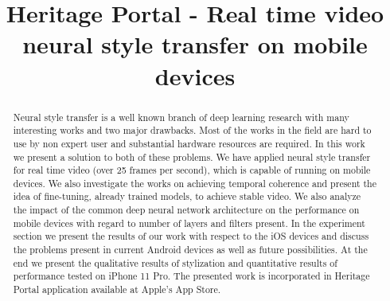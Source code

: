 \documentclass[a4paper,conference]{IEEEtran}
\begin{document}
%
\title{Heritage Portal - Real time video neural style transfer on mobile devices}


\author{
\and
{}
}



\maketitle

\begin{abstract}
Neural style transfer is a well known branch of deep learning research with many interesting works and two major drawbacks. Most of the works in the field are hard to use by non expert user and substantial hardware resources are required. In this work we present a solution to both of these problems. We have applied neural style transfer for real time video (over 25 frames per second), which is capable of running on mobile devices. We also investigate the works on achieving temporal coherence and present the idea of fine-tuning, already trained models, to achieve stable video. We also analyze the impact of the common deep neural network  architecture on the performance on mobile devices with regard to number of layers and filters present. In the experiment section we present the results of our work with respect to the iOS devices and discuss the problems present in current Android devices as well as future possibilities. At the end we present the qualitative results of stylization and quantitative results of performance tested on iPhone 11 Pro. The presented work is incorporated in Heritage Portal application available at Apple's App Store.
\end{abstract}
\end{document}
